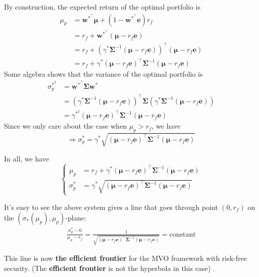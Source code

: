 \documentclass[13pt]{article}
\theoremstyle{definition}
\theoremstyle{remark}
\newenvironment{remark}
  {\pushQED{\qed}\renewcommand{\qedsymbol}{$\triangle$}\remarkx}
  {\popQED\endremarkx}
\begin{document}
By construction, the expected return of the optimal portfolio is
\begin{align*}
\mu_{p}&=\bm{w}^{*^\top}\bm{\mu}+\left(1-\bm{w}^{*^\top} \bm{e}\right) r_{f}\\
&=r_{f}+\bm{w}^{*^\top} (\bm{\mu}-r_f\bm{e})\\
&=r_{f}+\left(\gamma^*\mathbf{\Sigma}^{-1}(\bm{\mu}- r_f \bm{e})\right)^{\top}(\bm{\mu}-r_f\bm{e})\\
&=r_{f}+\gamma^{*}\left(\bm{\mu}-r_{f} \bm{e}\right)^{\top} \mathbf{\Sigma}^{-1}\left(\bm{\mu}-r_{f} \bm{e}\right)
\end{align*}
Some algebra shows that the variance of the optimal portfolio is
$$
\begin{aligned}
\sigma_{p}^{*^2} & =\bm{w}^{*^\top} \mathbf{\Sigma} \bm{w}^{*} \\
& =\left(\gamma^*\mathbf{\Sigma}^{-1}(\bm{\mu}- r_f \bm{e})\right)^{\top} \mathbf{\Sigma}\left(\gamma^*\mathbf{\Sigma}^{-1}(\bm{\mu}- r_f \bm{e})\right) \\
&=\gamma^{*^2}\left(\bm{\mu}-r_{f} \bm{e}\right)^{\top} \mathbf{\Sigma}^{-1}\left(\bm{\mu}-r_{f} \bm{e}\right)
\end{aligned}
$$
Since we only care about the case when $\mu_p>r_f$, we have
\[
\Longrightarrow \sigma_{p}^{*}=\gamma^{*}\sqrt{\left(\bm{\mu}-r_{f} \bm{e}\right)^{\top} \mathbf{\Sigma}^{-1}\left(\bm{\mu}-r_{f} \bm{e}\right)}
\]
{\color{C6}In all, we have
$$
\begin{cases}
    \mu_{p}&=r_{f}+\gamma^{*}\left(\bm{\mu}-r_{f} \bm{e}\right)^{\top} \mathbf{\Sigma}^{-1}\left(\bm{\mu}-r_{f} \bm{e}\right)\\
\sigma_{p}^{*}&=\gamma^{*}\sqrt{\left(\bm{\mu}-r_{f} \bm{e}\right)^{\top} \mathbf{\Sigma}^{-1}\left(\bm{\mu}-r_{f} \bm{e}\right)}
\end{cases}
$$

It's easy to see the above system gives a line that goes through point $(0, r_f)$ on the $\left(\sigma_{*}\left(\mu_p\right), \mu_p\right)$-plane:
\begin{align}
    \frac{\sigma_{p}^{*}-0}{\mu_{p} - r_f} = \frac{1}{\sqrt{\left(\bm{\mu}-r_{f} \bm{e}\right)^{\top} \mathbf{\Sigma}^{-1}\left(\bm{\mu}-r_{f} \bm{e}\right)}} = \text{constant} \label{eq:cml slope}
\end{align}}

\begin{remark}This line is now \textbf{the efficient frontier} for the MVO framework with risk-free security. (The \textbf{efficient frontier} is not the  hyperbola in this case) .
\end{remark}
\end{document}
